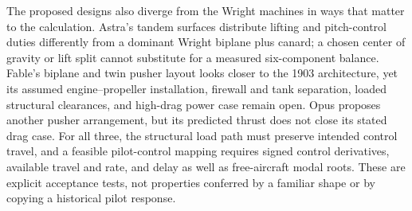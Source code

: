 The proposed designs also diverge from the Wright machines in ways that
matter to the calculation. Astra's tandem surfaces distribute lifting and
pitch-control duties differently from a dominant Wright biplane plus
canard; a chosen center of gravity or lift split cannot substitute for a
measured six-component balance. Fable's biplane and twin pusher layout
looks closer to the 1903 architecture, yet its assumed engine--propeller
installation, firewall and tank separation, loaded structural clearances,
and high-drag power case remain open. Opus proposes another pusher
arrangement, but its predicted thrust does not close its stated drag case.
For all three, the structural load path must preserve intended control
travel, and a feasible pilot-control mapping requires signed control
derivatives, available travel and rate, and delay as well as free-aircraft
modal roots. These are explicit acceptance tests, not properties conferred
by a familiar shape or by copying a historical pilot response.
